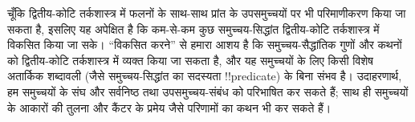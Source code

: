 \documentclass[../../../include/open-logic-section]{subfiles}
\begin{document}


चूँकि द्वितीय-कोटि तर्कशास्त्र में फलनों के साथ-साथ प्रांत के उपसमुच्चयों
पर भी परिमाणीकरण किया जा सकता है, इसलिए यह अपेक्षित है कि कम-से-कम कुछ
समुच्चय-सिद्धांत द्वितीय-कोटि तर्कशास्त्र में विकसित किया जा सके। ``विकसित
करने'' से हमारा आशय है कि समुच्चय-सैद्धांतिक गुणों और कथनों को
द्वितीय-कोटि तर्कशास्त्र में व्यक्त किया जा सकता है, और यह समुच्चयों के लिए
किसी विशेष अतार्किक शब्दावली (जैसे समुच्चय-सिद्धांत का सदस्यता
!!{predicate}) के बिना संभव है। उदाहरणार्थ, हम समुच्चयों के संघ और
सर्वनिष्ठ तथा उपसमुच्चय-संबंध को परिभाषित कर सकते हैं; साथ ही समुच्चयों के
आकारों की तुलना और कैंटर के प्रमेय जैसे परिणामों का कथन भी कर सकते हैं।
\end{document}
